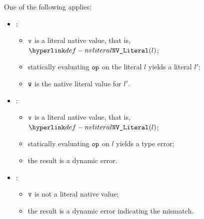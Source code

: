 \ProseParagraph
One of the following applies:
\begin{itemize}
  \item {}:
  \begin{itemize}
    \item $\vv$ is a literal native value, that is, $\nvliteral{l}$;
    \item statically evaluating $\op$ on the literal $l$ yields a literal $l'$;
    \item $\vw$ is the native literal value for $l'$.
  \end{itemize}

  \item {}:
  \begin{itemize}
    \item $\vv$ is a literal native value, that is, $\nvliteral{l}$;
    \item statically evaluating $\op$ on $l$ yields a type error;
    \item the result is a dynamic error.
  \end{itemize}

  \item {}:
  \begin{itemize}
    \item $\vv$ is not a literal native value;
    \item the result is a dynamic error indicating the mismatch.
  \end{itemize}
\end{itemize}

\FormallyParagraph
\begin{mathpar}
\end{mathpar}

\begin{mathpar}
\end{mathpar}

\begin{mathpar}
\end{mathpar}

